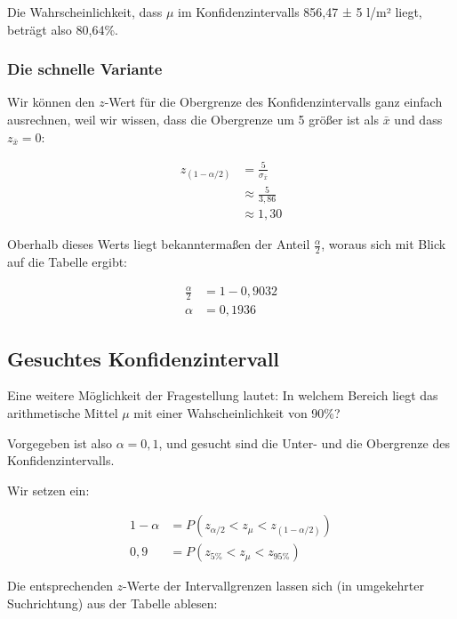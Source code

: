 \documentclass[
  11pt,
  ngerman,
  a4paper,
]{report}
\begin{document}
Die Wahrscheinlichkeit, dass \(\mu\) im Konfidenzintervalls 856,47 ± 5 l/m² liegt, beträgt also 80,64\%.

\hypertarget{die-schnelle-variante}{%
\subsubsection{Die schnelle Variante}\label{die-schnelle-variante}}

Wir können den \(z\)-Wert für die Obergrenze des Konfidenzintervalls ganz einfach ausrechnen, weil wir wissen, dass die Obergrenze um 5 größer ist als \(\bar{x}\) und dass \(z_{\bar{x}}=0\):

\nopagebreak

\[\begin{aligned}
z_{(1-\alpha/2)}&=\frac{5}{\sigma_{\bar{x}}}\\
&\approx\frac{5}{3,86}\\
&\approx1{,}30
\end{aligned}\]

Oberhalb dieses Werts liegt bekanntermaßen der Anteil \(\frac{\alpha}{2}\), woraus sich mit Blick auf die Tabelle ergibt:

\nopagebreak

\[\begin{aligned}
\frac{\alpha}{2}&=1-0,9032\\[4pt]
\alpha&=0,1936
\end{aligned}\]

\hypertarget{gesuchtes-konfidenzintervall}{%
\subsection{Gesuchtes Konfidenzintervall}\label{gesuchtes-konfidenzintervall}}

Eine weitere Möglichkeit der Fragestellung lautet: In welchem Bereich liegt das arithmetische Mittel \(\mu\) mit einer Wahscheinlichkeit von 90\%?

Vorgegeben ist also \(\alpha=0{,}1\), und gesucht sind die Unter- und die Obergrenze des Konfidenzintervalls.

Wir setzen ein:

\nopagebreak

\[\begin{aligned}
1-\alpha&=P(z_{\alpha/2} < z_{\mu} < z_{(1-\alpha/2)})\\[4pt]
0{,}9 &= P(z_{5\%} < z_{\mu} < z_{95\%})
\end{aligned}\]

Die entsprechenden \(z\)-Werte der Intervallgrenzen lassen sich (in umgekehrter Suchrichtung) aus der Tabelle ablesen:
\end{document}
